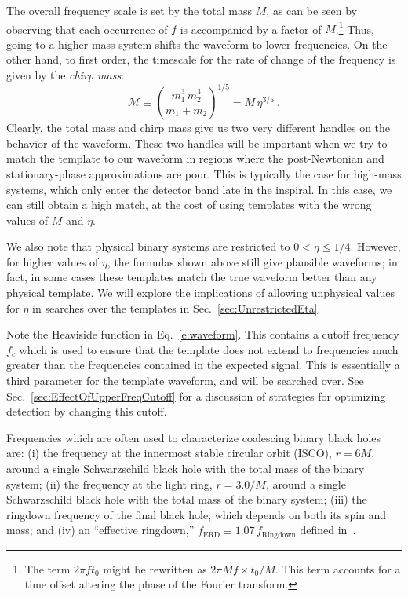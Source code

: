 The overall frequency scale is set by the total mass $M$, as can be
seen by observing that each occurrence of $f$ is accompanied by a
factor of $M$.\footnote{The term $2\pi f t_{0}$ might be rewritten as
  $2\pi Mf \times t_{0}/M$.  This term accounts for a time offset
  altering the phase of the Fourier transform.}  %
Thus, going to a higher-mass system shifts the waveform to lower
frequencies.  On the other hand, to first order, the timescale for the
rate of change of the frequency is given by the \textit{chirp mass}:
\begin{equation}
  \label{eq:ChirpMass}
  \mathcal{M} \equiv \left( \frac{m_{1}^{3}\, m_{2}^{3}} {m_{1} +
      m_{2}} \right)^{1/5} = M\, \eta^{3/5}\ .
\end{equation}
Clearly, the total mass and chirp mass give us two very different
handles on the behavior of the waveform.  These two handles will be
important when we try to match the template to our waveform in regions
where the post-Newtonian and stationary-phase approximations are poor.
This is typically the case for high-mass systems, which only enter the
detector band late in the inspiral.  In this case, we can still obtain
a high match, at the cost of using templates with the wrong values of
$M$ and $\eta$.

We also note that physical binary systems are restricted to $0 < \eta
\leq 1/4$.  However, for higher values of $\eta$, the formulas shown
above still give plausible waveforms; in fact, in some cases these
templates match the true waveform better than any physical template.
We will explore the implications of allowing unphysical values for
$\eta$ in searches over the templates in
Sec.~\ref{sec:UnrestrictedEta}.

Note the Heaviside function in Eq.~\eqref{e:waveform}.  This contains
a cutoff frequency $f_{c}$ which is used to ensure that the template
does not extend to frequencies much greater than the frequencies
contained in the expected signal.  This is essentially a third
parameter for the template waveform, and will be searched over.  See
Sec.~\ref{sec:EffectOfUpperFreqCutoff} for a discussion of strategies
for optimizing detection by changing this cutoff.

Frequencies which are often used to characterize coalescing binary
black holes are: (i) the frequency at the innermost stable circular
orbit (ISCO), $r=6 M$, around a single Schwarzschild black hole with
the total mass of the binary system; (ii) the frequency at the light
ring, $r=3.0/M$, around a single Schwarzschild black hole with the
total mass of the binary system; (iii) the ringdown frequency of the
final black hole, which depends on both its spin and mass; and (iv) an
``effective ringdown,'' $f_{\mathrm{ERD}} \equiv 1.07\,
f_{\mathrm{Ringdown}}$ defined in~\cite{Pan2007}.


